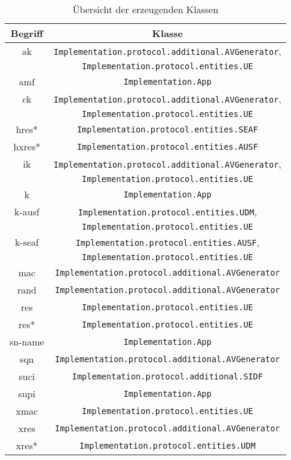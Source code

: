 \begin{table}
\centering
\begin{tabular}{|c|c|}
\hline
\textbf{Begriff} & \textbf{Klasse} \\ \hline
{\gls{ak}} & \texttt{Implementation.protocol.additional.AVGenerator}, \\
 & \texttt{Implementation.protocol.entities.UE} \\
{\gls{amf}} & \texttt{Implementation.App} \\
{\gls{ck}} & \texttt{Implementation.protocol.additional.AVGenerator}, \\
 & \texttt{Implementation.protocol.entities.UE} \\
{\gls{hres*}} & \texttt{Implementation.protocol.entities.SEAF} \\
{\gls{hxres*}} & \texttt{Implementation.protocol.entities.AUSF} \\
{\gls{ik}} & \texttt{Implementation.protocol.additional.AVGenerator}, \\
 & \texttt{Implementation.protocol.entities.UE} \\
{\gls{k}} & \texttt{Implementation.App} \\
{\gls{k-ausf}} & \texttt{Implementation.protocol.entities.UDM}, \\
 & \texttt{Implementation.protocol.entities.UE} \\
{\gls{k-seaf}} & \texttt{Implementation.protocol.entities.AUSF}, \\
 & \texttt{Implementation.protocol.entities.UE} \\
{\gls{mac}} & \texttt{Implementation.protocol.additional.AVGenerator} \\
{\gls{rand}} & \texttt{Implementation.protocol.additional.AVGenerator} \\
{\gls{res}} & \texttt{Implementation.protocol.entities.UE} \\
{\gls{res*}} & \texttt{Implementation.protocol.entities.UE} \\
{\gls{sn-name}} & \texttt{Implementation.App} \\
{\gls{sqn}} & \texttt{Implementation.protocol.additional.AVGenerator} \\
{\gls{suci}} & \texttt{Implementation.protocol.additional.SIDF} \\
{\gls{supi}} & \texttt{Implementation.App} \\
{\gls{xmac}} & \texttt{Implementation.protocol.entities.UE} \\
{\gls{xres}} & \texttt{Implementation.protocol.additional.AVGenerator} \\
{\gls{xres*}} & \texttt{Implementation.protocol.entities.UDM} \\
\hline
\end{tabular}
\caption{Übersicht der erzeugenden Klassen}
\label{tab:overview_generating_classes}
\end{table}





